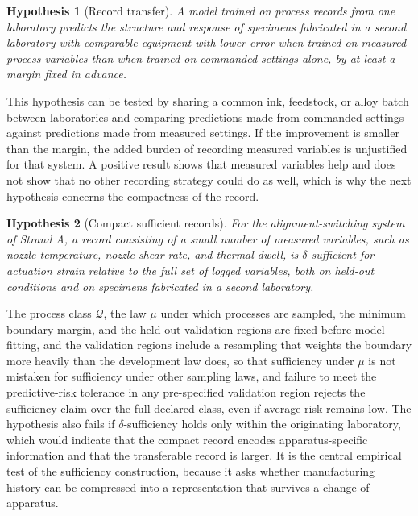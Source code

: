 \documentclass[11pt]{article}
\newtheorem{hypothesis}{Hypothesis}
\theoremstyle{definition}
\begin{document}
\begin{hypothesis}[Record transfer]
\label{hyp:record}
A model trained on process records from one laboratory predicts the structure and response of specimens fabricated in a second laboratory with comparable equipment with lower error when trained on measured process variables than when trained on commanded settings alone, by at least a margin fixed in advance.
\end{hypothesis}

This hypothesis can be tested by sharing a common ink, feedstock, or alloy batch between laboratories and comparing predictions made from commanded settings against predictions made from measured settings. If the improvement is smaller than the margin, the added burden of recording measured variables is unjustified for that system. A positive result shows that measured variables help and does not show that no other recording strategy could do as well, which is why the next hypothesis concerns the compactness of the record.

\begin{hypothesis}[Compact sufficient records]
\label{hyp:compact}
For the alignment-switching system of Strand A, a record consisting of a small number of measured variables, such as nozzle temperature, nozzle shear rate, and thermal dwell, is $\delta$-sufficient for actuation strain relative to the full set of logged variables, both on held-out conditions and on specimens fabricated in a second laboratory.
\end{hypothesis}

The process class $\mathcal{Q}$, the law $\mu$ under which processes are sampled, the minimum boundary margin, and the held-out validation regions are fixed before model fitting, and the validation regions include a resampling that weights the boundary more heavily than the development law does, so that sufficiency under $\mu$ is not mistaken for sufficiency under other sampling laws, and failure to meet the predictive-risk tolerance in any pre-specified validation region rejects the sufficiency claim over the full declared class, even if average risk remains low. The hypothesis also fails if $\delta$-sufficiency holds only within the originating laboratory, which would indicate that the compact record encodes apparatus-specific information and that the transferable record is larger. It is the central empirical test of the sufficiency construction, because it asks whether manufacturing history can be compressed into a representation that survives a change of apparatus.
\end{document}

